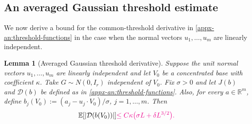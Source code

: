 \documentclass[11pt,letterpaper]{article}
\newcommand{\vSix}[1]{{\color{magenta}#1}}
\newtheorem{lemma}{Lemma}
\theoremstyle{remark}
\newcommand{\E}{\mathbb E}
\newcommand{\R}{\mathbb R}
\begin{document}
\subsection{An averaged Gaussian threshold estimate}
\label{appx-an:sec:threshold}
\begingroup
We now derive a bound for the common-threshold derivative in
\eqref{appx-an:threshold-functions} in the case when the normal vectors $u_1,\dots, u_m$ are linearly independent.

\begin{lemma}[Averaged Gaussian threshold derivative]
\label{appx-an:lem:threshold}
Suppose the unit normal vectors $u_1,\dots, u_m$ are linearly independent and let \(V_0\) be a
concentrated base\vSix{ with coefficient \(\kappa\)}. Take \(G\sim N(0,I_r)\) independent of \(V_0\). Fix \(\sigma>0\) and let $J(b)$ and $\mathcal D(b)$ be defined as in \eqref{appx-an:threshold-functions}.
Also, for every \(a\in\R^m\), {define}
\(b_j(V_0):=(a_j-u_j\cdot V_0)/\sigma\), $j=1,\dots, m$. Then
\begin{equation}
 \E[|\mathcal D(b(V_0))|]
\vSix{\le C\kappa\bigl(\sigma L+\delta L^{3/2}\bigr).}
 \label{appx-an:threshold-bound}
\end{equation}
\end{lemma}
\end{document}
